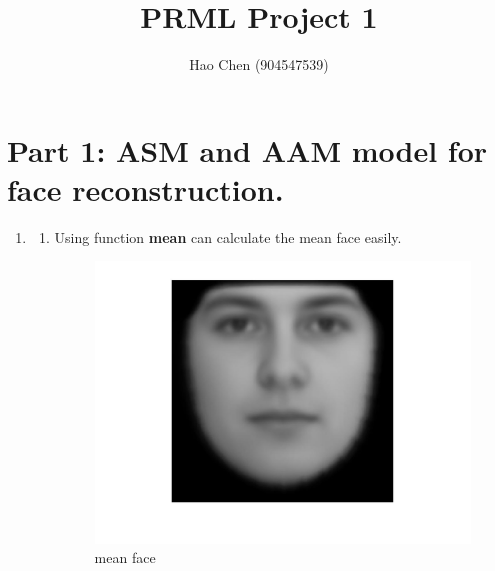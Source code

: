 \documentclass[12pt]{ctexart}
\title{	
\normalfont \normalsize 
\huge PRML Project 1\\ %
}
\author{Hao Chen (904547539)} %
\begin{document}
\maketitle

\section{Part 1: ASM and AAM model for face reconstruction.}
\begin{enumerate}
\item

\begin{enumerate}
\item
Using function {\bf{mean}} can calculate the mean face easily. 
\begin{figure}[h!]
  \centering
  \includegraphics[scale=0.2]{a_mean_face.jpg}
  \caption{mean face}
\end{figure}


\end{enumerate}
\end{enumerate}
\end{document}
